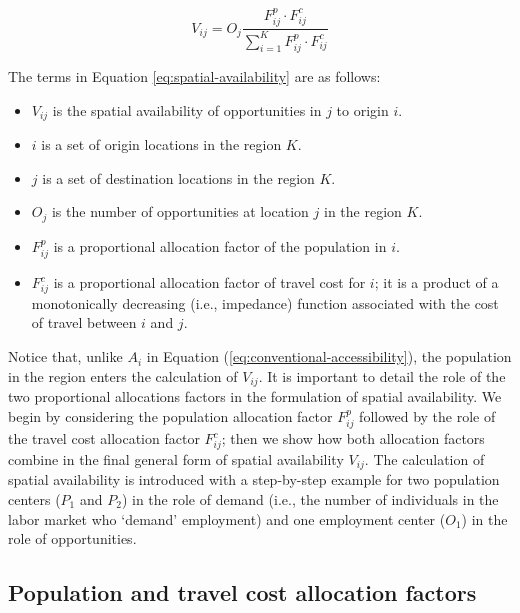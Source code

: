 \documentclass[]{elsarticle} %
\providecommand{\tightlist}{%
  \setlength{\itemsep}{0pt}\setlength{\parskip}{0pt}}
\begin{document}
\begin{equation}
\label{eq:spatial-availability}
V_{ij} = O_j\frac{F^p_{ij} \cdot F^c_{ij}}{\sum_{i=1}^K F^p_{ij} \cdot F^c_{ij}}
\end{equation}

The terms in Equation \ref{eq:spatial-availability} are as follows:

\begin{itemize}
\tightlist
\item
  \(V_{ij}\) is the spatial availability of opportunities in \(j\) to
  origin \(i\).
\item
  \(i\) is a set of origin locations in the region \(K\).
\item
  \(j\) is a set of destination locations in the region \(K\).
\item
  \(O_j\) is the number of opportunities at location \(j\) in the region
  \(K\).
\item
  \(F^p_{ij}\) is a proportional allocation factor of the population in
  \(i\).
\item
  \(F^c_{ij}\) is a proportional allocation factor of travel cost for
  \(i\); it is a product of a monotonically decreasing (i.e., impedance)
  function associated with the cost of travel between \(i\) and \(j\).
\end{itemize}

Notice that, unlike \(A_i\) in Equation
(\ref{eq:conventional-accessibility}), the population in the region
enters the calculation of \(V_{ij}\). It is important to detail the role
of the two proportional allocations factors in the formulation of
spatial availability. We begin by considering the population allocation
factor \(F^p_{ij}\) followed by the role of the travel cost allocation
factor \(F^c_{ij}\); then we show how both allocation factors combine in
the final general form of spatial availability \(V_{ij}\). The
calculation of spatial availability is introduced with a step-by-step
example for two population centers (\(P_1\) and \(P_2\)) in the role of
demand (i.e., the number of individuals in the labor market who `demand'
employment) and one employment center (\(O_1\)) in the role of
opportunities.

\hypertarget{population-and-travel-cost-allocation-factors}{%
\subsection{Population and travel cost allocation
factors}\label{population-and-travel-cost-allocation-factors}}
\end{document}
